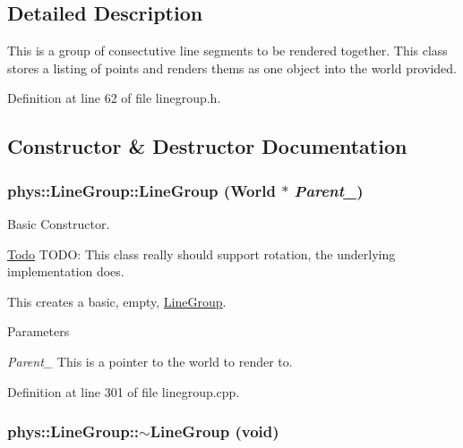 \subsection{Detailed Description}
This is a group of consectutive line segments to be rendered together. This class stores a listing of points and renders thems as one object into the world provided. 

Definition at line 62 of file linegroup.h.



\subsection{Constructor \& Destructor Documentation}
\hypertarget{classphys_1_1LineGroup_a676039a6beec56d24c631e9da5fd7e76}{
\subsubsection[{LineGroup}]{\setlength{\rightskip}{0pt plus 5cm}phys::LineGroup::LineGroup ({\bf World} $\ast$ {\em Parent\_\-})}}
\label{db/ddb/classphys_1_1LineGroup_a676039a6beec56d24c631e9da5fd7e76}


Basic Constructor. 

\begin{Desc}
\item[\hyperlink{todo__todo000016}{Todo}]TODO: This class really should support rotation, the underlying implementation does. \end{Desc}


This creates a basic, empty, \hyperlink{classphys_1_1LineGroup}{LineGroup}. 
\begin{DoxyParams}{Parameters}
\item[{\em Parent\_\-}]This is a pointer to the world to render to. \end{DoxyParams}


Definition at line 301 of file linegroup.cpp.

\hypertarget{classphys_1_1LineGroup_a0ddd66bc946dd266e3b666c8101ea7f8}{
\subsubsection[{$\sim$LineGroup}]{\setlength{\rightskip}{0pt plus 5cm}phys::LineGroup::$\sim$LineGroup (void)}}
\label{db/ddb/classphys_1_1LineGroup_a0ddd66bc946dd266e3b666c8101ea7f8}


